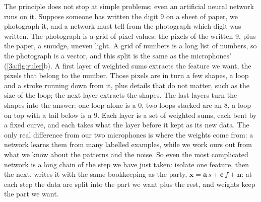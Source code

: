 The principle does not stop at simple problems; even an artificial neural
network runs on it. Suppose someone has written the digit 9 on a sheet of
paper, we photograph it, and a network must tell from the photograph which
digit was written. The photograph is a grid of pixel values: the pixels of
the written 9, plus the paper, a smudge, uneven light. A grid of numbers is a
long list of numbers, so the photograph is a vector, and this split is the
same as the microphones' (\cref{3a:fig:ruler}b). A first layer of
weighted sums extracts the feature we want, the pixels that belong to the
number. Those pixels are in turn a few shapes, a loop and a stroke running
down from it, plus details that do not matter, such as the size of the
loop; the next layer extracts the shapes. The last layers turn the shapes
into the answer: one loop alone is a 0, two loops stacked are an 8, a loop
on top with a tail below is a 9. Each layer is a set of weighted sums, each
bent by a fixed curve, and each takes what the layer before it kept as its
new data. The only real difference from our two microphones is where the
weights come from: a network learns them from many labelled examples, while
we work ours out from what we know about the patterns and the noise. So
even the most complicated network is a long chain of the step we have just
taken: isolate one feature, then the next.  writes it
with the same bookkeeping as the party, $\bm x=\bm a\,s+\bm c\,f+\bm n$:
at each step the data are split into the part we want plus the rest, and
weights keep the part we want.

